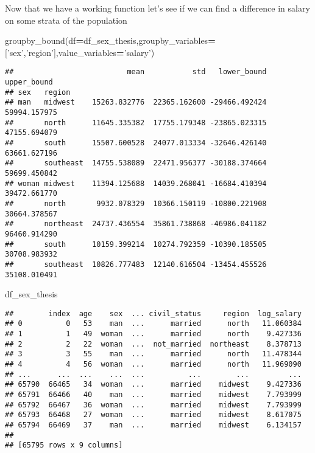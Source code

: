 \documentclass[]{article}
\newenvironment{Shaded}{\begin{snugshade}}{\end{snugshade}}
\newcommand{\NormalTok}[1]{#1}
\newcommand{\OperatorTok}[1]{\textcolor[rgb]{0.81,0.36,0.00}{\textbf{#1}}}
\newcommand{\StringTok}[1]{\textcolor[rgb]{0.31,0.60,0.02}{#1}}
\begin{document}
Now that we have a working function let's see if we can find a
difference in salary on some strata of the population

\begin{Shaded}
\begin{Highlighting}[]
\NormalTok{groupby_bound(df}\OperatorTok{=}\NormalTok{df_sex_thesis,groupby_variables}\OperatorTok{=}\NormalTok{[}\StringTok{'sex'}\NormalTok{,}\StringTok{'region'}\NormalTok{],value_variables}\OperatorTok{=}\StringTok{'salary'}\NormalTok{)}
\end{Highlighting}
\end{Shaded}

\begin{verbatim}
##                          mean           std   lower_bound   upper_bound
## sex   region                                                           
## man   midwest    15263.832776  22365.162600 -29466.492424  59994.157975
##       north      11645.335382  17755.179348 -23865.023315  47155.694079
##       south      15507.600528  24077.013334 -32646.426140  63661.627196
##       southeast  14755.538089  22471.956377 -30188.374664  59699.450842
## woman midwest    11394.125688  14039.268041 -16684.410394  39472.661770
##       north       9932.078329  10366.150119 -10800.221908  30664.378567
##       northeast  24737.436554  35861.738868 -46986.041182  96460.914290
##       south      10159.399214  10274.792359 -10390.185505  30708.983932
##       southeast  10826.777483  12140.616504 -13454.455526  35108.010491
\end{verbatim}

\begin{Shaded}
\begin{Highlighting}[]
\NormalTok{df_sex_thesis}
\end{Highlighting}
\end{Shaded}

\begin{verbatim}
##        index  age    sex  ... civil_status     region  log_salary
## 0          0   53    man  ...      married      north   11.060384
## 1          1   49  woman  ...      married      north    9.427336
## 2          2   22  woman  ...  not_married  northeast    8.378713
## 3          3   55    man  ...      married      north   11.478344
## 4          4   56  woman  ...      married      north   11.969090
## ...      ...  ...    ...  ...          ...        ...         ...
## 65790  66465   34  woman  ...      married    midwest    9.427336
## 65791  66466   40    man  ...      married    midwest    7.793999
## 65792  66467   36  woman  ...      married    midwest    7.793999
## 65793  66468   27  woman  ...      married    midwest    8.617075
## 65794  66469   37    man  ...      married    midwest    6.134157
## 
## [65795 rows x 9 columns]
\end{verbatim}
\end{document}
